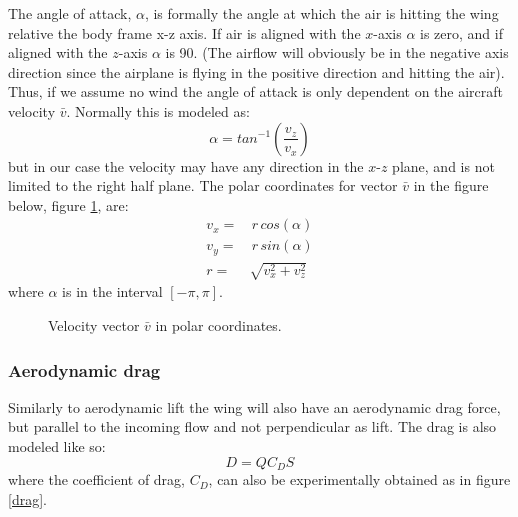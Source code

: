 The angle of attack, $\alpha$, is formally the angle at which the air is hitting the wing relative the body frame x-z axis.
If air is aligned with the $x$-axis $\alpha$ is zero, and if aligned with the $z$-axis $\alpha$ is 90.
(The airflow will obviously be in the negative axis direction since the airplane is flying in the positive direction and hitting the air).
Thus, if we assume no wind the angle of attack is only dependent on the aircraft velocity $\bar{v}$.
Normally this is modeled as:
\begin{equation}
    \alpha = tan^{-1}(\frac{v_z}{v_x})
    \label{eq:aoa}
\end{equation}
but in our case the velocity may have any direction in the $x$-$z$ plane, and is not limited to the right half plane.
The polar coordinates for vector $\bar{v}$ in the figure below, figure \ref{polar}, are:
\begin{equation}\begin{split}
    v_x =& \, r \, cos(\alpha) \\
    v_y =& \, r \, sin(\alpha) \\
    r =& \sqrt{v_x^2 + v_z^2}
    \label{eq:polar}
\end{split}\end{equation}
where $\alpha$ is in the interval $[-\pi,\pi]$.

\begin{figure}[h]
    \center
    
    \caption{Velocity vector $\bar{v}$ in polar coordinates.}
    \label{polar}
\end{figure}

\subsubsection{Aerodynamic drag}
Similarly to aerodynamic lift the wing will also have an aerodynamic drag force, but parallel to the incoming flow and not perpendicular as lift.
The drag is also modeled like so:
\begin{equation}
    D = Q C_D S
\end{equation}
where the coefficient of drag, $C_D$, can also be experimentally obtained as in figure \ref{drag}.

